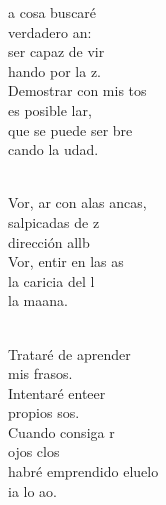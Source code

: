 \begin{cancion}%
	a cosa buscaré\\
	 verdadero an: \\
	ser capaz de vir\\
	hando por la z.\\
	Demostrar con mis tos\\
	 es posible lar,\\
	que se puede ser bre\\
	cando la udad. \\\jump\\
	\begin{chorus}%
	Vor, ar con alas ancas,\\
	salpicadas de z\\
	dirección allb\\
	Vor, entir en las as\\
	la caricia del l\\
	la maana.\\
	\end{chorus}%
	\jump\\
Trataré de aprender\\
	mis frasos.\\
	Intentaré enteer\\
	 propios sos.\\
	Cuando consiga r\\
	 ojos clos\\
	habré emprendido eluelo\\
	ia lo ao.  \\
\end{cancion}%
